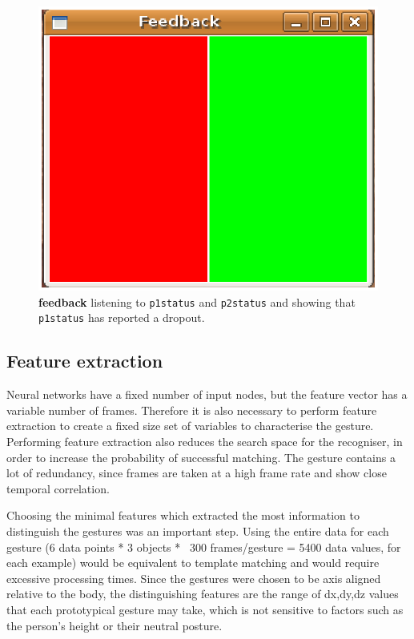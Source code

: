 \documentclass[12pt,a4,notitlepage]{report}
\renewcommand{\_}{\texttt{\symbol{95}}}
\newcommand{\<}{\texttt{\symbol{60}}}
\renewcommand{\>}{\texttt{\symbol{62}}}
\newcommand{\class}[1]{\textbf{#1}}
\newcommand{\scopendpoint}[1]{\texttt{#1}}
\begin{document}
\begin{figure}
\centering
\includegraphics[scale=0.4,angle=0]{images/feedback.ps}
\caption{\class{feedback} listening to \scopendpoint{p1status} and \scopendpoint{p2status} and showing that \scopendpoint{p1status} has reported a dropout.}
\label{feedback}
\end{figure}

\subsection{Feature extraction}

Neural networks have a fixed number of input nodes, but the feature
vector has a variable number of frames. Therefore it is also necessary
to perform feature extraction to create a fixed size set of variables to
characterise the gesture. Performing feature extraction also reduces the
search space for the recogniser, in order to increase the probability of
successful matching. The gesture contains a lot of redundancy, since
frames are taken at a high frame rate and show close temporal
correlation.

Choosing the minimal features which extracted the most information to
distinguish the gestures was an important step. Using the entire data
for each gesture (6 data points * 3 objects * ~300 frames/gesture = 5400
data values, for each example) would be equivalent to template matching
and would require excessive processing times. Since the gestures were
chosen to be axis aligned relative to the body, the distinguishing
features are the range of dx,dy,dz values that each prototypical gesture
may take, which is not sensitive to factors such as the person's height
or their neutral posture.
\end{document}
